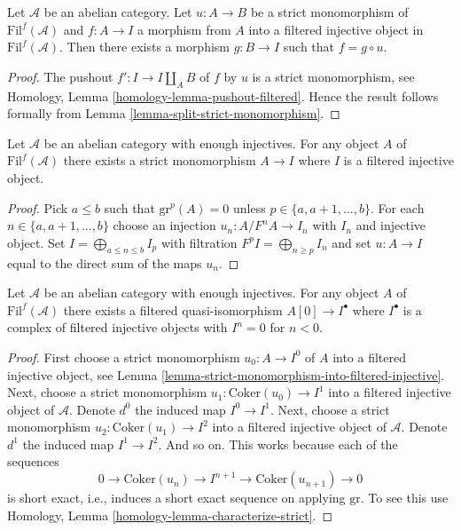 \begin{lemma}
\label{lemma-injective-property-filtered-injective}
Let $\mathcal{A}$ be an abelian category.
Let $u : A \to B$ be a strict monomorphism
of $\text{Fil}^f(\mathcal{A})$
and $f : A \to I$ a morphism from $A$ into a filtered injective object
in $\text{Fil}^f(\mathcal{A})$.
Then there exists a morphism $g : B \to I$ such that $f = g \circ u$.
\end{lemma}

\begin{proof}
The pushout $f' : I \to I \amalg_A B$ of $f$ by $u$ is a strict
monomorphism, see
Homology, Lemma \ref{homology-lemma-pushout-filtered}.
Hence the result follows formally from
Lemma \ref{lemma-split-strict-monomorphism}.
\end{proof}

\begin{lemma}
\label{lemma-strict-monomorphism-into-filtered-injective}
Let $\mathcal{A}$ be an abelian category with enough injectives.
For any object $A$ of $\text{Fil}^f(\mathcal{A})$ there exists
a strict monomorphism $A \to I$
where $I$ is a filtered injective object.
\end{lemma}

\begin{proof}
Pick $a \leq b$ such that $\text{gr}^p(A) = 0$ unless
$p \in \{a, a + 1, \ldots, b\}$. For each
$n \in \{a, a + 1, \ldots, b\}$ choose an injection
$u_n : A/F^nA \to I_n$ with $I_n$ and injective object.
Set $I = \bigoplus_{a \leq n \leq b} I_p$ with filtration
$F^pI = \bigoplus_{n \geq p} I_n$ and set $u : A \to I$ equal to
the direct sum of the maps $u_n$.
\end{proof}

\begin{lemma}
\label{lemma-filtered-injective-right-resolution-single-object}
Let $\mathcal{A}$ be an abelian category with enough injectives.
For any object $A$ of $\text{Fil}^f(\mathcal{A})$ there exists
a filtered quasi-isomorphism $A[0] \to I^\bullet$
where $I^\bullet$ is a complex of filtered injective objects
with $I^n = 0$ for $n < 0$.
\end{lemma}

\begin{proof}
First choose a strict monomorphism $u_0 : A \to I^0$ of $A$ into a filtered
injective object, see
Lemma \ref{lemma-strict-monomorphism-into-filtered-injective}.
Next, choose a strict monomorphism
$u_1 : \text{Coker}(u_0) \to I^1$ into a filtered injective object of
$\mathcal{A}$. Denote $d^0$ the induced map $I^0 \to I^1$.
Next, choose a strict monomorphism $u_2 : \text{Coker}(u_1) \to I^2$ into
a filtered injective object of $\mathcal{A}$. Denote $d^1$ the induced
map $I^1 \to I^2$. And so on. This works because each
of the sequences
$$
0 \to \text{Coker}(u_n) \to I^{n + 1} \to \text{Coker}(u_{n + 1}) \to 0
$$
is short exact, i.e., induces a short exact sequence on applying
$\text{gr}$. To see this use
Homology, Lemma \ref{homology-lemma-characterize-strict}.
\end{proof}

